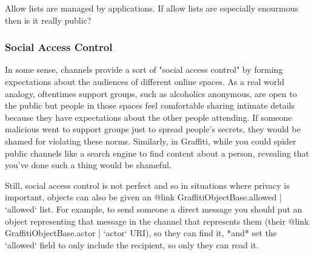 Allow lists are managed by applications.
If allow lists are especially enourmous then is it really public?

\subsubsection{Social Access Control}

In some sense, channels provide a sort of "social access control" by forming
expectations about the audiences of different online spaces.
As a real world analogy, oftentimes support groups, such as alcoholics
anonymous, are open to the public but people in those spaces feel comfortable sharing intimate details
because they have expectations about the other people attending.
If someone malicious went to support groups just to spread people's secrets,
they would be shamed for violating these norms.
Similarly, in Graffiti, while you could spider public channels like a search engine
to find content about a person, revealing that you've done such a thing
would be shameful.

Still, social access control is not perfect and so in situations where privacy is important,
objects can also be given
an {@link GraffitiObjectBase.allowed | `allowed`} list.
For example, to send someone a direct message you should put an object representing
that message in the channel that represents them (their {@link GraffitiObjectBase.actor | `actor` URI}),
so they can find it, *and* set the `allowed` field to only include the recipient,
so only they can read it.
